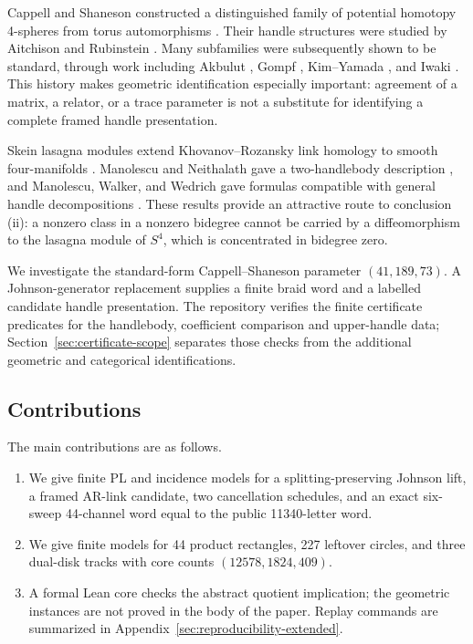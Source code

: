 \documentclass[11pt]{amsart}
\theoremstyle{definition}
\theoremstyle{remark}
\begin{document}
Cappell and Shaneson constructed a distinguished family of potential
homotopy 4-spheres from torus automorphisms \cite{CappellShaneson1976}.
Their handle structures were studied by Aitchison and Rubinstein
\cite{AitchisonRubinstein1984}.  Many subfamilies were subsequently shown to
be standard, through work including Akbulut \cite{Akbulut2010}, Gompf
\cite{Gompf2010}, Kim--Yamada \cite{KimYamada2017}, and Iwaki
\cite{Iwaki2024}.  This history makes geometric identification especially
important: agreement of a matrix, a relator, or a trace parameter is not a
substitute for identifying a complete framed handle presentation.

Skein lasagna modules extend Khovanov--Rozansky link homology to smooth
four-manifolds \cite{MorrisonWalkerWedrich2019}.  Manolescu and Neithalath
gave a two-handlebody description \cite{ManolescuNeithalath2020}, and
Manolescu, Walker, and Wedrich gave formulas compatible with general handle
decompositions \cite{ManolescuWalkerWedrich2023}.  These results provide an
attractive route to conclusion (ii): a nonzero class in a nonzero bidegree
cannot be carried by a diffeomorphism to the lasagna module of $S^4$, which
is concentrated in bidegree zero.

We investigate the standard-form Cappell--Shaneson parameter
$(41,189,73)$.  A Johnson-generator replacement supplies a finite braid word
and a labelled candidate handle presentation.  The repository verifies the
finite certificate predicates for the handlebody, coefficient comparison and
upper-handle data; Section~\ref{sec:certificate-scope} separates those checks
from the additional geometric and categorical identifications.

\subsection*{Contributions}

The main contributions are as follows.
\begin{enumerate}
\item We give finite PL and incidence models for a splitting-preserving
Johnson lift, a framed AR-link candidate, two cancellation schedules, and an
exact six-sweep 44-channel word equal to the public 11340-letter word.
\item We give finite models for 44 product rectangles, 227 leftover circles,
and three dual-disk tracks with core counts $(12578,1824,409)$.
\item A formal Lean core checks the abstract quotient implication; the
geometric instances are not proved in the body of the paper.  Replay
commands are summarized in Appendix~\ref{sec:reproducibility-extended}.
\end{enumerate}
\end{document}

